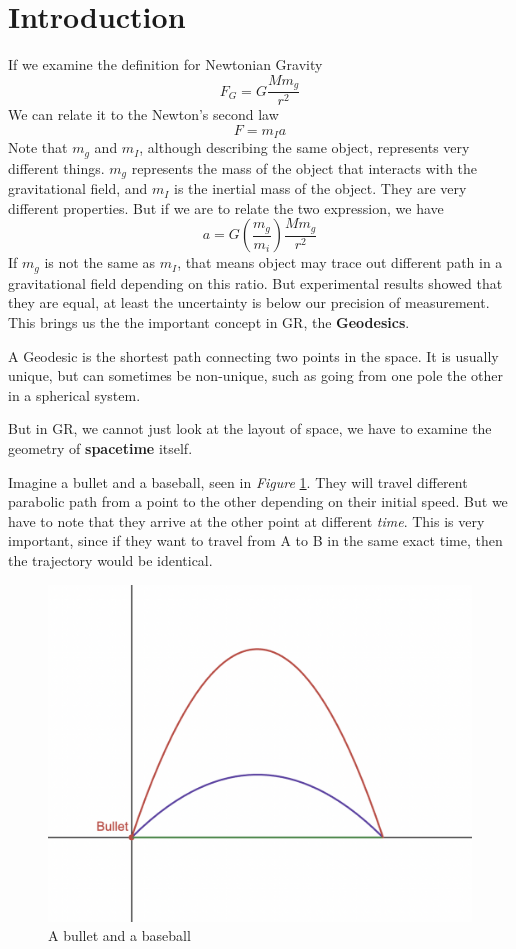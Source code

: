 \documentclass[12pt]{book}
\newcommand{\paren}[1]{\left( #1 \right)}
\begin{document}
\section{Introduction}
If we examine the definition for Newtonian Gravity
\[
F_G = G\frac{Mm_g}{r^2}
\]
We can relate it to the Newton's second law
\[
F = m_I a
\]
Note that $m_g$ and $m_I$, although describing the same object, represents very different things. $m_g$ represents the mass of the object that interacts with the gravitational field, and $m_I$ is the inertial mass of the object. They are very different properties. But if we are to relate the two expression, we have
\[
a = G\paren{\frac{m_g}{m_i}}\frac{Mm_g}{r^2}
\]
If $m_g$ is not the same as $m_I$, that means object may trace out different path in a gravitational field depending on this ratio. But experimental results showed that they are equal, at least the uncertainty is below our precision of measurement. This brings us the the important concept in GR, the \textbf{Geodesics}.

A Geodesic is the shortest path connecting two points in the space. It is usually unique, but can sometimes be non-unique, such as going from one pole the other in a spherical system. 

But in GR, we cannot just look at the layout of space, we have to examine the geometry of \textbf{spacetime} itself. 

Imagine a bullet and a baseball, seen in \textit{Figure} \ref{fig:5.1.1}. They will travel different parabolic path from a point to the other depending on their initial speed. But we have to note that they arrive at the other point at different \textit{time}. This is very important, since if they want to travel from A to B in the same exact time, then the trajectory would be identical. 

\begin{figure}[!h]
    \centering
    \includegraphics[width=0.5\linewidth]{picture/GRW1-1.png}
    \caption{A bullet and a baseball}
    \label{fig:5.1.1}
\end{figure}
\end{document}
